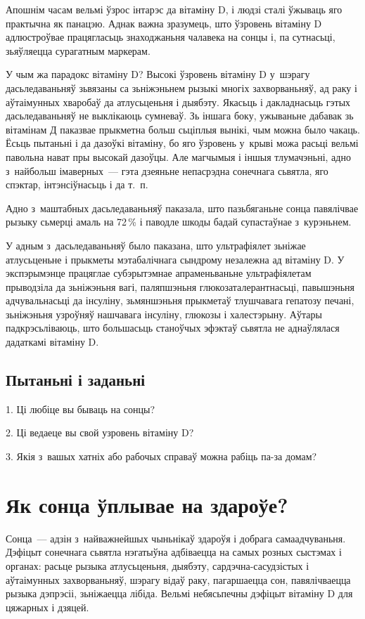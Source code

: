 Апошнім часам вельмі ўзрос інтарэс да вітаміну D, і людзі сталі ўжываць яго практычна як панацэю. Аднак важна зразумець, што ўзровень вітаміну D адлюстроўвае працягласьць знаходжаньня чалавека на сонцы і, па сутнасьці, зьяўляецца сурагатным маркерам.

У чым жа парадокс вітаміну D? Высокі ўзровень вітаміну D у~шэрагу дасьледаваньняў зьвязаны са зьніжэньнем рызыкі многіх захворваньняў, ад раку і аўтаімунных хваробаў да атлусьценьня і дыябэту. Якасьць і дакладнасьць гэтых дасьледаваньняў не выклікаюць сумневаў. Зь іншага боку, ужываньне дабавак зь вітамінам Д паказвае прыкметна больш сьціплыя вынікі, чым можна было чакаць. Ёсьць пытаньні і да дазоўкі вітаміну, бо яго ўзровень у~крыві можа расьці вельмі павольна нават пры высокай дазоўцы. Але магчымыя і іншыя тлумачэньні, адно з~найбольш імаверных~--- гэта дзеяньне непасрэдна сонечнага сьвятла, яго спэктар, інтэнсіўнасьць і да т.~п. 

Адно з~маштабных дасьледаваньняў паказала, што пазьбяганьне сонца павялічвае рызыку сьмерці амаль на 72\,\% і паводле шкоды бадай супастаўнае з~курэньнем.

У адным з~дасьледаваньняў было паказана, што ультрафіялет зьніжае атлусьценьне і прыкметы мэтабалічнага сындрому незалежна ад вітаміну D. У экспэрымэнце працяглае субэрытэмнае апраменьваньне ультрафіялетам прыводзіла да зьніжэньня вагі, паляпшэньня глюкозаталерантнасьці, павышэньня адчувальнасьці да інсуліну, зьмяншэньня прыкметаў тлушчавага гепатозу печані, зьніжэньня узроўняў нашчавага інсуліну, глюкозы і халестэрыну. Аўтары падкрэсьліваюць, што большасьць станоўчых эфэктаў сьвятла не аднаўлялася дадаткамі вітаміну D.

\subsection*{Пытаньні і заданьні}

1. Ці любіце вы бываць на сонцы?

2. Ці ведаеце вы свой узровень вітаміну D?

3. Якія з~вашых хатніх або рабочых справаў можна рабіць па-за домам?


\section{Як сонца ўплывае на здароўе?}

Сонца~--- адзін з~найважнейшых чыньнікаў здароўя і добрага самаадчуваньня. Дэфіцыт сонечнага сьвятла нэгатыўна адбіваецца на самых розных сыстэмах і органах: расьце рызыка атлусьценьня, дыябэту, сардэчна-сасудзістых і аўтаімунных захворваньняў, шэрагу відаў раку, пагаршаецца сон, павялічваецца рызыка дэпрэсіі, зьніжаецца лібіда. Вельмі небясьпечны дэфіцыт вітаміну D для цяжарных і дзяцей.

